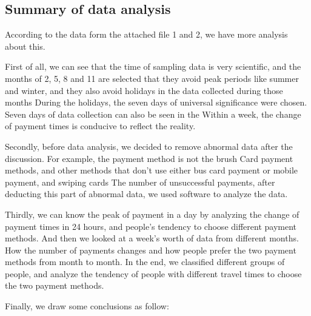 \documentclass[../mcmpaper]{subfiles}
\begin{document}
\subsection{Summary of data analysis}
\indent{}According to the data form the attached file 1 and 2, we have more analysis about this.
\par
First of all, we can see that the time of sampling data is very scientific, and the months of 2, 5, 8 and 11 are selected that they avoid peak periods like summer and winter, and they also avoid holidays in the data collected during those months During the holidays, the seven days of universal significance were chosen. Seven days of data collection can also be seen in the Within a week, the change of payment times is conducive to reflect the reality.
\par
Secondly, before data analysis, we decided to remove abnormal data after the discussion. For example, the payment method is not the brush Card payment methods, and other methods that don't use either bus card payment or mobile payment, and swiping cards The number of unsuccessful payments, after deducting this part of abnormal data, we used software to analyze the data.
\par
Thirdly, we can know the peak of payment in a day by analyzing the change of payment times in 24 hours, and people's tendency to choose different payment methods. And then we looked at a week's worth of data from different months. How the number of payments changes and how people prefer the two payment methods from month to month. In the end, we classified different groups of people, and analyze the tendency of people with different travel times to choose the two payment methods.
\par
Finally, we draw some conclusions as follow:
\end{document}
